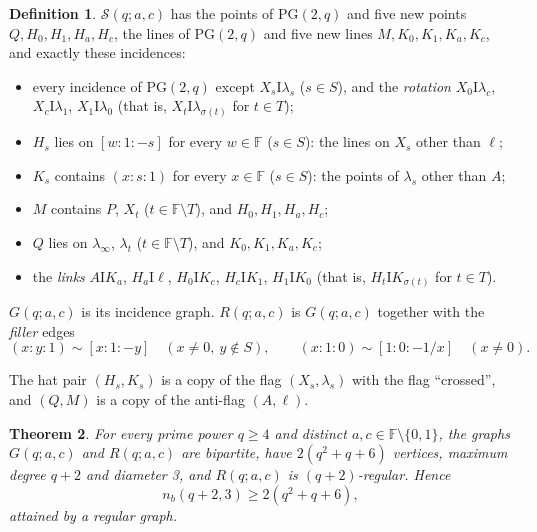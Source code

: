 \documentclass[11pt]{amsart}
\newtheorem{theorem}{Theorem}[section]
\theoremstyle{definition}
\newtheorem{definition}[theorem]{Definition}
\theoremstyle{remark}
\numberwithin{equation}{section}
\newcommand{\F}{\mathbb F}
\newcommand{\PG}{\mathrm{PG}}
\newcommand{\I}{\mathrel{\mathrm I}}
\newcommand{\nb}{n_b}
\newcommand{\cS}{\mathcal S}
\begin{document}
\begin{definition}\label{def:hat4}
$\cS(q;a,c)$ has the points of $\PG(2,q)$ and five new points $Q,H_0,H_1,H_a,H_c$, the lines of $\PG(2,q)$ and five
new lines $M,K_0,K_1,K_a,K_c$, and exactly these incidences:
\begin{itemize}
\item[(C1)] every incidence of $\PG(2,q)$ except $X_s\I\lambda_s$ ($s\in S$), and the \emph{rotation}
  $X_0\I\lambda_c$, $X_c\I\lambda_1$, $X_1\I\lambda_0$ (that is, $X_t\I\lambda_{\sigma(t)}$ for $t\in T$);
\item[(C2)] $H_s$ lies on $[w:1:-s]$ for every $w\in\F$ ($s\in S$): the lines on $X_s$ other than $\ell$;
\item[(C3)] $K_s$ contains $(x:s:1)$ for every $x\in\F$ ($s\in S$): the points of $\lambda_s$ other than $A$;
\item[(C4)] $M$ contains $P$, $X_t$ ($t\in\F\setminus T$), and $H_0,H_1,H_a,H_c$;
\item[(C5)] $Q$ lies on $\lambda_\infty$, $\lambda_t$ ($t\in\F\setminus T$), and $K_0,K_1,K_a,K_c$;
\item[(C6)] the \emph{links} $A\I K_a$, $H_a\I\ell$, $H_0\I K_c$, $H_c\I K_1$, $H_1\I K_0$ (that is, $H_t\I
  K_{\sigma(t)}$ for $t\in T$).
\end{itemize}
$G(q;a,c)$ is its incidence graph. $R(q;a,c)$ is $G(q;a,c)$ together with the \emph{filler} edges
\[
(x:y:1)\sim[x:1:-y]\quad(x\ne0,\ y\notin S),\qquad (x:1:0)\sim[1:0:-1/x]\quad(x\ne0).
\]
\end{definition}

The hat pair $(H_s,K_s)$ is a copy of the flag $(X_s,\lambda_s)$ with the flag ``crossed'', and $(Q,M)$ is a copy of the
anti-flag $(A,\ell)$.

\begin{theorem}\label{thm:hat4}
For every prime power $q\ge4$ and distinct $a,c\in\F\setminus\{0,1\}$, the graphs $G(q;a,c)$ and $R(q;a,c)$ are
bipartite, have $2(q^2+q+6)$ vertices, maximum degree $q+2$ and diameter 3, and $R(q;a,c)$ is $(q+2)$-regular. Hence
\[
\nb(q+2,3)\ge2(q^2+q+6),
\]
attained by a regular graph.
\end{theorem}
\end{document}
